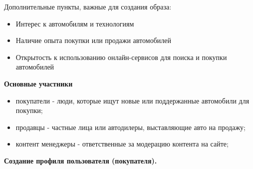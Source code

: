Дополнительные пункты, важные для создания образа:
\begin{itemize}
    \item Интерес к автомобилям и технологиям
    \item Наличие опыта покупки или продажи автомобилей
    \item Открытость к использованию онлайн-сервисов для поиска и покупки автомобилей
\end{itemize}
\bigskip

\textbf{Основные участники}
\bigskip

\begin{itemize}
    \item покупатели - люди, которые ищут новые или поддержанные автомобили для покупки;
    \item продавцы - частные лица или автодилеры, выставляющие авто на продажу;
    \item контент менеджеры - ответственные за модерацию контента на сайте;
\end{itemize}

\textbf{Создание профиля пользователя (покупателя).}

\noindent
\begin{minipage}{\linewidth}
\end{minipage}
\bigskip

